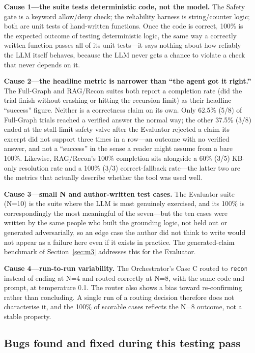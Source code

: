 \documentclass[conference]{IEEEtran}
\begin{document}
\textbf{Cause 1---the suite tests deterministic code, not the model.} The
Safety gate is a keyword allow/deny check; the reliability harness is
string/counter logic; both are unit tests of hand-written functions. Once
the code is correct, 100\% is the expected outcome of testing deterministic
logic, the same way a correctly written function passes all of its unit
tests---it says nothing about how reliably the LLM itself behaves, because
the LLM never gets a chance to violate a check that never depends on it.

\textbf{Cause 2---the headline metric is narrower than ``the agent got it
right.''} The Full-Graph and RAG/Recon suites both report a completion rate
(did the trial finish without crashing or hitting the recursion limit) as
their headline ``success'' figure. Neither is a correctness claim on its own.
Only 62.5\% (5/8) of Full-Graph trials reached a verified answer the normal
way; the other 37.5\% (3/8) ended at the stall-limit
safety valve after the Evaluator rejected a claim its excerpt did not support three times
in a row---an outcome with no verified answer, and not a ``success'' in the sense a
reader might assume from a bare 100\%. Likewise, RAG/Recon's 100\% completion sits
alongside a 60\% (3/5) KB-only resolution rate and a 100\% (3/3)
correct-fallback rate---the latter two are the metrics that actually
describe whether the tool was used well.

\textbf{Cause 3---small N and author-written test cases.} The Evaluator
suite (N=10) is the suite where the LLM is most genuinely exercised, and
its 100\% is correspondingly the most meaningful of the seven---but the ten
cases were written by the same people who built the grounding logic,
not held out or generated adversarially, so an edge case the author did not
think to write would not appear as a failure here even if it exists in
practice. The generated-claim benchmark of Section~\ref{sec:m3} addresses
this for the Evaluator.

\textbf{Cause 4---run-to-run variability.} The Orchestrator's Case C
routed to \texttt{recon} instead of ending at N=4 and routed correctly at
N=8, with the same code and prompt, at temperature 0.1. The router also
shows a bias toward re-confirming rather than concluding. A single run of
a routing decision therefore does not characterise it, and the 100\% of
scorable cases reflects the N=8 outcome, not a stable property.

\subsection{Bugs found and fixed during this testing pass}
\end{document}
